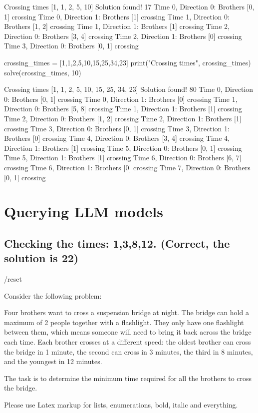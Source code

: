 \begin{result}
Crossing times [1, 1, 2, 5, 10]
Solution found! 17
Time 0, Direction 0: Brothers [0, 1] crossing
Time 0, Direction 1: Brothers [1] crossing
Time 1, Direction 0: Brothers [1, 2] crossing
Time 1, Direction 1: Brothers [1] crossing
Time 2, Direction 0: Brothers [3, 4] crossing
Time 2, Direction 1: Brothers [0] crossing
Time 3, Direction 0: Brothers [0, 1] crossing
\end{result}

\begin{python}
crossing_times = [1,1,2,5,10,15,25,34,23]
print("Crossing times", crossing_times)
solve(crossing_times, 10)
\end{python}

\begin{result}
Crossing times [1, 1, 2, 5, 10, 15, 25, 34, 23]
Solution found! 80
Time 0, Direction 0: Brothers [0, 1] crossing
Time 0, Direction 1: Brothers [0] crossing
Time 1, Direction 0: Brothers [5, 8] crossing
Time 1, Direction 1: Brothers [1] crossing
Time 2, Direction 0: Brothers [1, 2] crossing
Time 2, Direction 1: Brothers [1] crossing
Time 3, Direction 0: Brothers [0, 1] crossing
Time 3, Direction 1: Brothers [0] crossing
Time 4, Direction 0: Brothers [3, 4] crossing
Time 4, Direction 1: Brothers [1] crossing
Time 5, Direction 0: Brothers [0, 1] crossing
Time 5, Direction 1: Brothers [1] crossing
Time 6, Direction 0: Brothers [6, 7] crossing
Time 6, Direction 1: Brothers [0] crossing
Time 7, Direction 0: Brothers [0, 1] crossing
\end{result}

\section{Querying LLM models}

\subsection{Checking the times: 1,3,8,12. (Correct, the solution is 22)}

\begin{ai}
/reset


Consider the following problem:

Four brothers want to cross a suspension bridge at night. The bridge can hold a
maximum of 2 people together with a flashlight. They only have one flashlight
between them, which means someone will need to bring it back across the bridge
each time. Each brother crosses at a different speed: the oldest brother can
cross the bridge in 1 minute, the second can cross in 3 minutes, the third in 8
minutes, and the youngest in 12 minutes.

The task is to determine the minimum time required for all the brothers to cross
the bridge.

Please use Latex markup for lists, enumerations, bold, italic and everything.
\end{ai}

